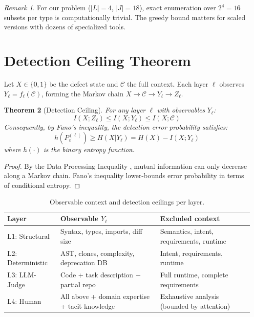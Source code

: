 \documentclass[11pt, a4paper]{article}
\newtheorem{theorem}{Theorem}[section]
\theoremstyle{definition}
\theoremstyle{remark}
\newtheorem{remark}[theorem]{Remark}
\begin{document}
\begin{remark}
For our problem ($|L| = 4$, $|J| = 18$), exact enumeration over $2^4 = 16$ subsets per type is computationally trivial. The greedy bound matters for scaled versions with dozens of specialized tools.
\end{remark}


\section{Detection Ceiling Theorem}
\label{sec:ceilings}

Let $X \in \{0,1\}$ be the defect state and $\mathcal{C}$ the full context. Each layer $\ell$ observes $Y_\ell = f_\ell(\mathcal{C})$, forming the Markov chain $X \to \mathcal{C} \to Y_\ell \to Z_\ell$.

\begin{theorem}[Detection Ceiling]
\label{thm:ceiling}
For any layer $\ell$ with observables $Y_\ell$:
\begin{equation}
I(X; Z_\ell) \leq I(X; Y_\ell) \leq I(X; \mathcal{C})
\end{equation}
Consequently, by Fano's inequality, the detection error probability satisfies:
\begin{equation}
h(P_e^{(\ell)}) \geq H(X | Y_\ell) = H(X) - I(X; Y_\ell)
\end{equation}
where $h(\cdot)$ is the binary entropy function.
\end{theorem}

\begin{proof}
By the Data Processing Inequality \citep{coverthomas2006}, mutual information can only decrease along a Markov chain. Fano's inequality lower-bounds error probability in terms of conditional entropy.
\end{proof}

\begin{table}[htbp]
\centering
\caption{Observable context and detection ceilings per layer.}
\label{tab:ceilings}
\small
\begin{tabularx}{\textwidth}{l X X}
\toprule
\textbf{Layer} & \textbf{Observable $Y_\ell$} & \textbf{Excluded context} \\
\midrule
L1: Structural & Syntax, types, imports, diff size & Semantics, intent, requirements, runtime \\
L2: Deterministic & AST, clones, complexity, deprecation DB & Intent, requirements, runtime \\
L3: LLM-Judge & Code + task description + partial repo & Full runtime, complete requirements \\
L4: Human & All above + domain expertise + tacit knowledge & Exhaustive analysis (bounded by attention) \\
\bottomrule
\end{tabularx}
\end{table}
\end{document}
